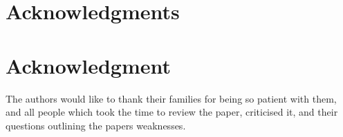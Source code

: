 \documentclass[9pt,journal,compsoc]{IEEEtran}
\begin{document}

\ifCLASSOPTIONcompsoc
  \section*{Acknowledgments}
\else
  \section*{Acknowledgment}
\fi
The authors would like to thank their families for being so patient with them, and all people which took the time to review the paper, criticised it, and their questions outlining the papers weaknesses.

\ifCLASSOPTIONcaptionsoff
  \newpage
\fi







%
%
%
%
\end{document}
